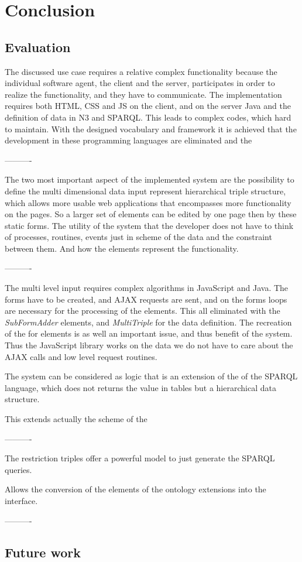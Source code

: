 

\chapter{Conclusion}

\section{Evaluation}




The discussed use case requires a relative complex functionality because the individual software agent, the client and the server, participates in order to realize the functionality, and they have to communicate. The implementation requires both HTML, CSS and JS on the client, and on the server Java and the definition of data in N3 and SPARQL. This leads to complex codes, which hard to maintain. With the designed vocabulary and framework it is achieved that the development in these programming languages are eliminated and the





----------

The two most important aspect of the implemented system are the possibility to define the multi dimensional data input represent hierarchical triple structure, which allows more usable web applications that encompasses more functionality on the pages. So a larger set of elements can be edited by one page then by these static forms. The utility of the system that the developer does not have to think of processes, routines, events just in scheme of the data and the constraint between them. And how the elements represent the functionality. 

----------

The multi level input requires complex algorithms in JavaScript and Java. The forms have to be created, and AJAX requests are sent, and on the forms loops are necessary for the processing of the elements. This all eliminated with the \textit{SubFormAdder} elements, and \textit{MultiTriple} for the data definition. The recreation of the for elements is as well an important issue, and thus benefit of the system. Thus the JavaScript library works on the data we do not have to care about the AJAX calls and low level request routines. 

The system can be considered as logic that is an extension of the of the SPARQL language, which does not returns the value in tables but a hierarchical data structure. 


This extends actually the scheme of the 

----------

The restriction triples offer a powerful model to just generate the SPARQL queries.




Allows the conversion of the elements of the ontology extensions into the interface. 


----------






\section{Future work}




